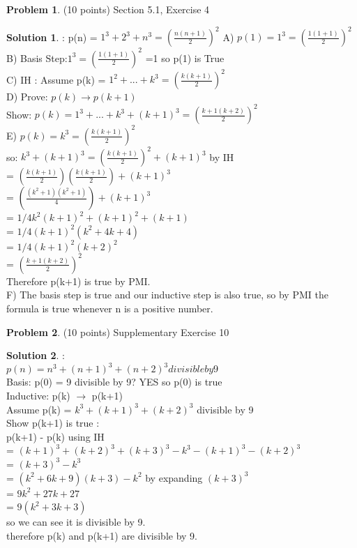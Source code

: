 \documentclass{article}
\theoremstyle{definition}
\newtheorem{problem}{Problem}
\newtheorem*{solution}{Solution}
\begin{document}
\begin{problem} (10 points) Section 5.1, Exercise 4
\end{problem}
\begin{solution}:
\newline
p(n) = $1^3 + 2^3 + n^3 = (\frac {n(n+1)}{2} )^2$
\newline
A) $p(1) = 1^3 = (\frac{1(1+1)}{2})^2 $
\newline
B) Basis Step:$ 1^3 = (\frac{1(1+1)}{2})^2 $
=1 so p(1) is True
\\
C) IH : Assume p(k) = $1^2 + ... + k^3 = (\frac{k(k+1)}{2})^2$
\\
D) Prove: $p(k) \to p(k+1)$
\\
Show: $ p(k) = 1^3 + ... + k^3 + (k+1)^3 = (\frac{k+1(k+2)}{2})^2$
\\
E) $ p(k) = k^3 = (\frac{k(k+1)}{2})^2$
\\
so:    $   k^3 + (k+1)^3 =  (\frac{k(k+1)}{2})^2 + (k+1)^3$   by IH
\\
= $(\frac{k(k+1)}{2}) (\frac{k(k+1)}{2}) + (k+1)^3 $
\\
= $(\frac{(k^2+1)(k^2+1)}{4}) + (k+1)^3$
\\ 
= $1/4 k^2 (k+1)^2 + (k+1)^2 + (k+1)$
\\
= $1/4 (k+1)^2(k^2+4k+4)$
\\
= $1/4(k+1)^2(k+2)^2$
\\
= $(\frac{k+1(k+2)}{2})^2$
\\ Therefore p(k+1) is true by PMI.
\\
F) The basis step is true and our inductive step is also true, so by PMI the formula is true whenever n is a positive number.
\end{solution}

\newpage

\begin{problem} (10 points) Supplementary Exercise 10
\end{problem}
\begin{solution}:
\\
$p(n) = n^3 + (n+1)^3 + (n+2)^3 divisible by 9$
\\
Basis: p(0) = 9 divisible by 9? YES so p(0) is true
\\
Inductive: p(k) $\to$ p(k+1)
\\ 
Assume p(k) = $ k^3 + (k+1)^3 + (k+2)^3$ divisible by 9
\\
Show p(k+1) is true :
\\
p(k+1) - p(k) using IH
\\
= $(k+1)^3 + (k+2)^3 + (k+3)^3 - k^3 - (k+1)^3 - (k+2)^3 $
\\
= $(k+3)^3 - k^3$
\\
= $(k^2+6k+9)(k+3) - k^2$ by expanding $(k+3)^3$
\\
= $9k^2 + 27k + 27$
\\
= $9(k^2+3k+3)$
\\
so we can see it is divisible by 9.
\\
therefore p(k) and p(k+1) are divisible by 9. 
\end{solution}
\newpage
\end{document}
